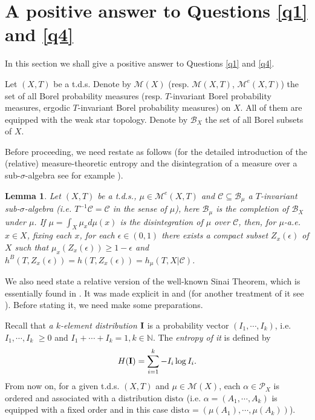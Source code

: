 \documentclass[12pt]{amsart}
\newtheorem{lem}[thm]{Lemma}
\theoremstyle{definition} \theoremstyle{question}
\numberwithin{equation}{section}
\begin{document}
\section{A positive answer to Questions \ref{q1} and \ref{q4}}

In this section we shall give a positive answer to Questions
\ref{q1} and \ref{q4}.

Let $(X, T)$ be a t.d.s. Denote by $\mathcal{M} (X)$ (resp.
$\mathcal{M} (X, T)$, $\mathcal{M}^e (X, T)$) the set of all Borel
probability measures (resp. $T$-invariant Borel probability
measures, ergodic $T$-invariant Borel probability measures) on $X$.
All of them are equipped with the weak star topology. Denote by
$\mathcal{B}_X$ the set of all Borel subsets of $X$.

Before proceeding, we need restate \cite[Lemma 4.3 (2)]{HYZ1} as
follows (for the detailed introduction of the (relative)
measure-theoretic entropy and the disintegration of a measure over a
sub-$\sigma$-algebra see for example \cite[\S 4]{HYZ1}).

\begin{lem} \label{0905081904}
Let $(X, T)$ be a t.d.s., $\mu\in \mathcal{M}^e(X, T)$ and
$\mathcal{C}\subseteq \mathcal{B}_\mu$ a $T$-invariant
sub-$\sigma$-algebra (i.e. $T^{- 1} \mathcal{C}= \mathcal{C}$ in the
sense of $\mu$), here $\mathcal{B}_\mu$ is the completion of
$\mathcal{B}_X$ under $\mu$. If $\mu= \int_X \mu_x d \mu (x)$ is the
disintegration of $\mu$ over $\mathcal{C}$, then, for $\mu$-a.e.
$x\in X$, fixing each $x$, for each $\epsilon\in (0, 1)$ there
exists a compact subset $Z_x (\epsilon)$ of $X$ such that $\mu_x
(Z_x (\epsilon))\ge 1- \epsilon$ and $h^B (T, Z_x (\epsilon))= h (T,
Z_x (\epsilon))= h_\mu (T, X| \mathcal{C})$.
\end{lem}

We also need state a relative version of the well-known Sinai
Theorem, which is essentially found in \cite{Orn}. It was made
explicit in \cite[Theorem 5]{OW} and \cite{Th} (for another
treatment of it see \cite{Ki}). Before stating it, we need
make some preparations.

Recall that {\it a $k$-element distribution} ${\bf I}$ is a
probability vector $(I_1, \cdots, I_k)$, i.e. $I_1, \cdots, I_k$ $\ge 0$ and $I_1+ \cdots+ I_k= 1,
k\in {\mathbb N}$. The {\it entropy of it} is defined by
$$H ({\bf I})= \sum_{i= 1}^k - I_i \log I_i.$$
From now on, for a
given t.d.s. $(X, T)$ and $\mu\in \mathcal{M} (X)$, each $\alpha\in
\mathcal{P}_X$ is ordered and associated with a distribution
$\text{dist} \alpha$ (i.e. $\alpha= (A_1, \cdots, A_k)$ is equipped
with a fixed order and in this case $\text{dist} \alpha= (\mu(A_1),
\cdots, \mu(A_k))$).
\end{document}
